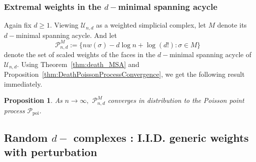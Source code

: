 \documentclass[12pt]{amsart}
\newcommand{\PoiP}{\mathscr{P}_{\text{poi}}}
\newcommand{\PoiM}{\mathscr{P}_{n, d}^{M}}
\newtheorem{prop}[theorem]{Proposition}
\numberwithin{equation}{section}
\numberwithin{theorem}{section}
\newcommand{\1}{\mathbf{1}}
\def\U{\mathcal{U}}
\begin{document}
\subsubsection{Extremal weights in the $d-$minimal spanning acycle}
\label{sec:minimal spanning acycle_weights}
%
Again fix $d \geq 1.$ Viewing $\U_{n, d}$ as a weighted simplicial complex, let $M$ denote its $d-$minimal spanning acycle. And let
\begin{equation}
\label{eqn:scaledWeights}
\PoiM := \{n w(\sigma) - d \log n + \log(d!): \sigma \in M\}
\end{equation}
%
denote the set of scaled weights of the faces in the $d-$minimal spanning acycle of $\U_{n, d}.$ Using Theorem~\ref{thm:death_MSA} and Proposition~\ref{thm:DeathPoissonProcessConvergence}, we get the following result
immediately.
%
\begin{prop}
\label{thm:WeightPoissonProcessConvergence}
As $n \to \infty,$ $\PoiM$ converges in distribution to the Poisson point process $\PoiP$.
\end{prop}
%


\subsection{Random $d-$ complexes : I.I.D. generic weights with perturbation}
\label{sec:extensions}
\end{document}
